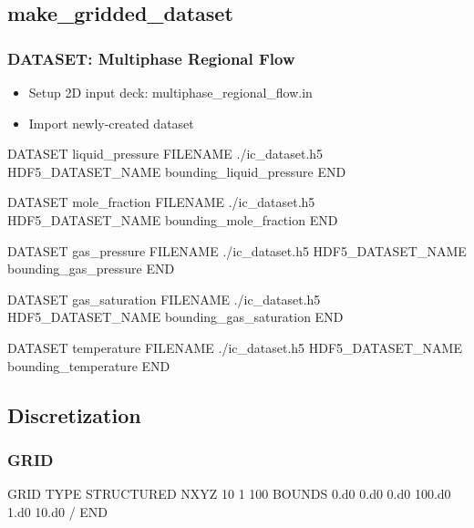 \documentclass{beamer}
\begin{document}
\subsection{make_gridded_dataset}

\begin{frame}\frametitle{DATASET: Multiphase Regional Flow}

\begin{itemize}
\item Setup 2D input deck: multiphase\_regional\_flow.in
\item Import newly-created dataset
\end{itemize}

\begin{semiverbatim}

DATASET liquid_pressure
  FILENAME ./ic_dataset.h5
  HDF5_DATASET_NAME bounding_liquid_pressure
END

DATASET mole_fraction
  FILENAME ./ic_dataset.h5
  HDF5_DATASET_NAME bounding_mole_fraction
END

\newpage

DATASET gas_pressure
  FILENAME ./ic_dataset.h5
  HDF5_DATASET_NAME bounding_gas_pressure
END

DATASET gas_saturation
  FILENAME ./ic_dataset.h5
  HDF5_DATASET_NAME bounding_gas_saturation
END

DATASET temperature
  FILENAME ./ic_dataset.h5
  HDF5_DATASET_NAME bounding_temperature
END

\end{semiverbatim}

\end{frame}
\subsection{Discretization}

\begin{frame}\frametitle{GRID}

\begin{semiverbatim}
GRID
  TYPE STRUCTURED
  NXYZ 10 1 100
  BOUNDS
    0.d0 0.d0 0.d0
    100.d0 1.d0 10.d0
  /
END
\end{semiverbatim}

\end{frame}
\end{document}

